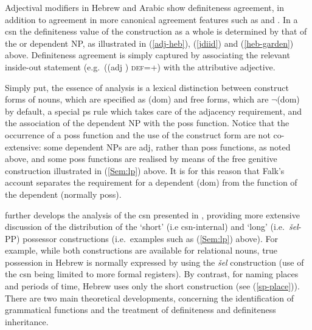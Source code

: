 \documentclass[output=paper,hidelinks]{langscibook}
\begin{document}
Adjectival modifiers in Hebrew and Arabic show definiteness agreement, in addition to agreement in more canonical agreement features such as \NUM and \GEND.  In a {\sc csn}  the definiteness value of the construction as a whole is determined by that of the \POSS or dependent NP, as   illustrated in (\ref{adj-heb}), (\ref{jdiid}) and (\ref{heb-garden}) above.
Definiteness agreement is simply captured by associating the relevant inside-out statement
(e.g.\ (({\sc adj} \UP) \textsc{def}=+) with the attributive adjective.


Simply put, the essence of   analysis is a lexical distinction between construct forms of nouns, which are specified as {(\UP\sc dom)} and free forms, which are {$\neg$(\UP\sc dom)} by default, a special  {\sc ps} rule which takes care of the adjacency requirement,  and the association of the dependent NP with the {\sc poss} function.  Notice that the occurrence of a {\sc poss} function and the use of the construct form are not co-extensive: some dependent NPs are {\sc adj}, rather than {\sc poss} functions, as noted above, and some {\sc poss} functions are realised by means of the free genitive construction illustrated in (\ref{Sem:lp}) above. It is for this reason that Falk's account separates the requirement for a dependent ({\sc dom}) from the function of the dependent (normally {\sc poss}).



\citet{Falk07} further develops the analysis of the {\sc csn} presented in \citet{Falk01actnom}, providing more extensive discussion of the distribution of the `short' (i.e {\sc csn}-internal) and `long' (i.e.\ {\em šel}-PP) possessor constructions (i.e.\ examples such as (\ref{Sem:lp}) above).
For example, while both constructions are available for relational nouns, true possession in Hebrew is normally expressed by using the {\em šel} construction (use of the {\sc csn}  being limited to more formal registers). By contrast, for naming places and periods of time, Hebrew uses only the short construction (see (\ref{sp-place})).    There are two main theoretical developments, concerning the identification of grammatical functions and  the treatment of definiteness and definiteness inheritance.
\end{document}
